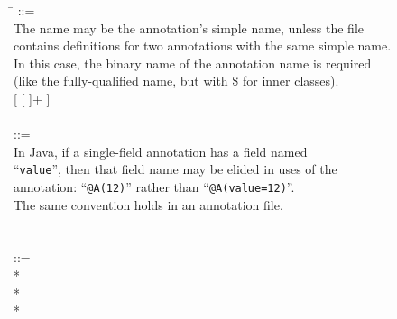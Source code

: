 \documentclass{article}
\begin{document}


\begin{tabbing}
\qquad \= \kill
{} ::= \\
\qquad    \bnfcmt The name may be the annotation's simple name, unless the file \\
\qquad    \bnfcmt contains definitions for two annotations with the same simple name. \\
\qquad    \bnfcmt In this case, the binary name of the annotation name is required \\
\qquad    \bnfcmt (like the fully-qualified name, but with \$ for inner classes). \\
\qquad    {} [ \bnflit{(}  [ \bnflit{,}  ]+ \bnflit{)} ] \\
\\
 ::= \\
\qquad    \bnfcmt In Java, if a single-field annotation has a field named \\
\qquad    \bnfcmt ``\texttt{value}'', then that field name may be elided in uses
of the \\ \qquad    \bnfcmt annotation:   ``\texttt{@A(12)}'' rather than ``\texttt{@A(value=12)}''. \\
\qquad    \bnfcmt The same convention holds in an annotation file. \\
\qquad    {} \bnflit{=}  \\
\\
 ::= \\
\qquad    {}  \bnflit{:} * \lineend  \\
\qquad        {}* \\
\qquad        {}* \\

\end{tabbing}
\end{document}

